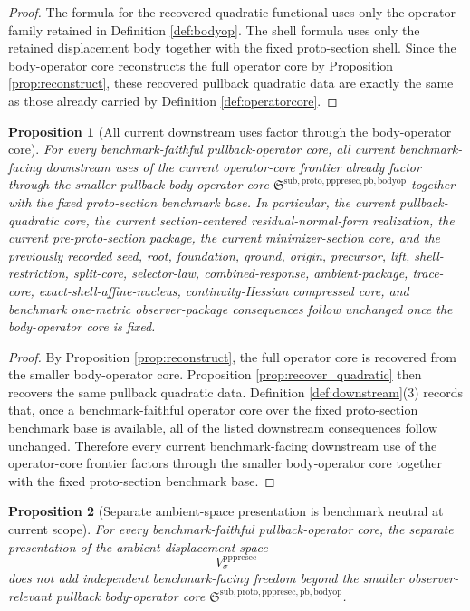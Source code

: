 \documentclass[11pt]{article}
\newcommand{\PrePreProtoSectionVertical}[1]{V_{#1}^{\mathrm{pppresec}}}
\newcommand{\PullbackBodyOperatorCore}{\mathfrak S^{\mathrm{sub,proto,pppresec,pb,bodyop}}}
\newtheorem{proposition}{Proposition}
\begin{document}
\begin{proof}
The formula for the recovered quadratic functional uses only the operator family retained in Definition \ref{def:bodyop}. The shell formula uses only the retained displacement body together with the fixed proto-section shell. Since the body-operator core reconstructs the full operator core by Proposition \ref{prop:reconstruct}, these recovered pullback quadratic data are exactly the same as those already carried by Definition \ref{def:operatorcore}.
\end{proof}

\begin{proposition}[All current downstream uses factor through the body-operator core]
\label{prop:downstream}
For every benchmark-faithful pullback-operator core, all current benchmark-facing downstream uses of the current operator-core frontier already factor through the smaller pullback body-operator core \(\PullbackBodyOperatorCore\) together with the fixed proto-section benchmark base. In particular, the current pullback-quadratic core, the current section-centered residual-normal-form realization, the current pre-proto-section package, the current minimizer-section core, and the previously recorded seed, root, foundation, ground, origin, precursor, lift, shell-restriction, split-core, selector-law, combined-response, ambient-package, trace-core, exact-shell-affine-nucleus, continuity-Hessian compressed core, and benchmark one-metric observer-package consequences follow unchanged once the body-operator core is fixed.
\end{proposition}

\begin{proof}
By Proposition \ref{prop:reconstruct}, the full operator core is recovered from the smaller body-operator core. Proposition \ref{prop:recover_quadratic} then recovers the same pullback quadratic data. Definition \ref{def:downstream}(3) records that, once a benchmark-faithful operator core over the fixed proto-section benchmark base is available, all of the listed downstream consequences follow unchanged. Therefore every current benchmark-facing downstream use of the operator-core frontier factors through the smaller body-operator core together with the fixed proto-section benchmark base.
\end{proof}

\begin{proposition}[Separate ambient-space presentation is benchmark neutral at current scope]
\label{prop:neutral}
For every benchmark-faithful pullback-operator core, the separate presentation of the ambient displacement space
\[
\PrePreProtoSectionVertical{\sigma}
\]
does not add independent benchmark-facing freedom beyond the smaller observer-relevant pullback body-operator core \(\PullbackBodyOperatorCore\).
\end{proposition}
\end{document}
